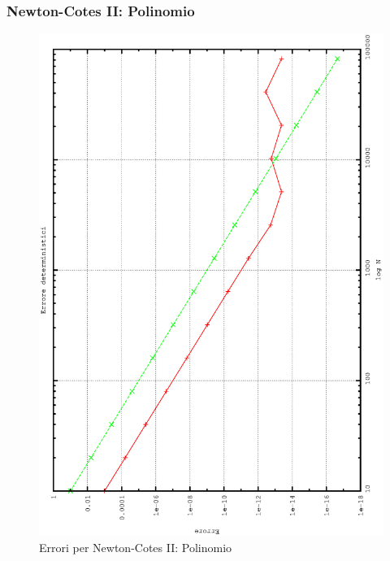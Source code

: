 \subsubsection{Newton-Cotes II: Polinomio}
\begin{figure}[!h]
\centering
\includegraphics[width=0.7\columnwidth,angle=-90]{plot_simp_poly.eps}
\caption{\small{Errori per Newton-Cotes II: Polinomio}}
\end{figure}

